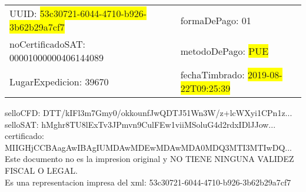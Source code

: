 \documentclass{article}
\begin{document}
\begin{tabular}{p{11cm}p{1cm}p{8cm}}
\bigskip
UUID: \colorbox{yellow}{ 53c30721-6044-4710-b926-3b62b29a7cf7 } & & formaDePago: 01\\

noCertificadoSAT: 00001000000406144089 & & metodoDePago: \colorbox{yellow}{ PUE }\\

LugarExpedicion: 39670 & & fechaTimbrado: \colorbox{yellow}{ 2019-08-22T09:25:39 } \\
\end{tabular}

\bigskip
selloCFD: DTT/kIFl3m7Gmy0/okkounfJwQDTJ51Wn3W/z+lcWXyi1CPn1z... \\
selloSAT: hMghr8TU8lExTv3JPmvn9CulFEw1viiMSoluG4d2rdxIDlJJow... \\

certificado: MIIGHjCCBAagAwIBAgIUMDAwMDEwMDAwMDA0MDQ3MTI3MTIwDQ...\bigskip\bigskip\bigskip\bigskip\bigskip\bigskip
\\Este documento no es la impresion original y NO TIENE NINGUNA VALIDEZ FISCAL O LEGAL. \\
 Es una representacion impresa del xml:  53c30721-6044-4710-b926-3b62b29a7cf7 \\
\end{document}

